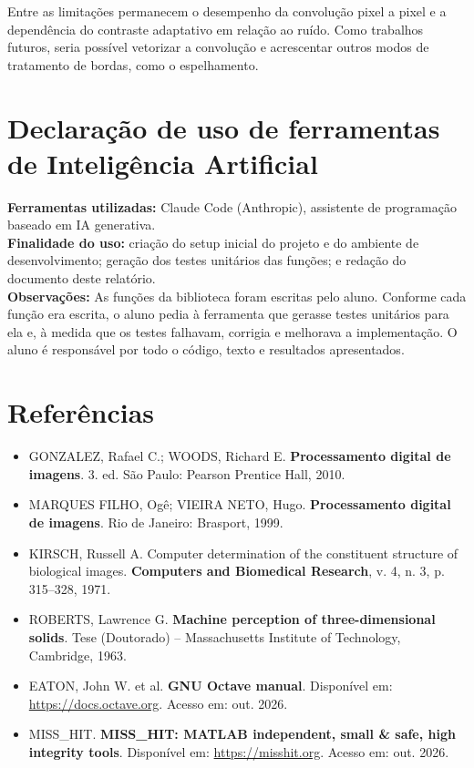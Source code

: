 \documentclass[11pt,a4paper]{article}
\begin{document}
Entre as limitações permanecem o desempenho da convolução pixel a pixel e a dependência do contraste adaptativo em relação ao ruído. Como trabalhos futuros, seria possível vetorizar a convolução e acrescentar outros modos de tratamento de bordas, como o espelhamento.

\section{Declaração de uso de ferramentas de Inteligência Artificial}

\begin{campo}
\textbf{Ferramentas utilizadas:} Claude Code (Anthropic), assistente de programação baseado em IA generativa.\\[3mm]
\textbf{Finalidade do uso:} criação do setup inicial do projeto e do ambiente de desenvolvimento; geração dos testes unitários das funções; e redação do documento deste relatório.\\[3mm]
\textbf{Observações:} As funções da biblioteca foram escritas pelo aluno. Conforme cada função era escrita, o aluno pedia à ferramenta que gerasse testes unitários para ela e, à medida que os testes falhavam, corrigia e melhorava a implementação. O aluno é responsável por todo o código, texto e resultados apresentados.
\end{campo}

\section{Referências}

\begin{itemize}
  \item GONZALEZ, Rafael C.; WOODS, Richard E. \textbf{Processamento digital de imagens}. 3. ed. São Paulo: Pearson Prentice Hall, 2010.
  \item MARQUES FILHO, Ogê; VIEIRA NETO, Hugo. \textbf{Processamento digital de imagens}. Rio de Janeiro: Brasport, 1999.
  \item KIRSCH, Russell A. Computer determination of the constituent structure of biological images. \textbf{Computers and Biomedical Research}, v. 4, n. 3, p. 315--328, 1971.
  \item ROBERTS, Lawrence G. \textbf{Machine perception of three-dimensional solids}. Tese (Doutorado) -- Massachusetts Institute of Technology, Cambridge, 1963.
  \item EATON, John W. et al. \textbf{GNU Octave manual}. Disponível em: \url{https://docs.octave.org}. Acesso em: out. 2026.
  \item MISS\_HIT. \textbf{MISS\_HIT: MATLAB independent, small \& safe, high integrity tools}. Disponível em: \url{https://misshit.org}. Acesso em: out. 2026.
\end{itemize}
\end{document}
